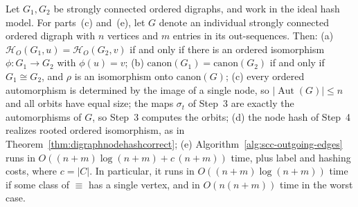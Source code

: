 \documentclass[twoside,leqno]{article}
\DeclareMathOperator{\Aut}{Aut}
\newcommand{\HO}{\mathcal{H}_{O}}
\newcommand{\canon}{\mathrm{canon}}
\newcommand{\iso}{\cong}
\begin{document}
\begin{theorem}
\label{thm:scc-ordered}
Let $G_1,G_2$ be strongly connected ordered digraphs, and work in the ideal hash model. For parts~(c) and~(e), let $G$ denote an individual strongly connected ordered digraph with $n$ vertices and $m$ entries in its out-sequences. Then:
(a) $\HO(G_1,u)=\HO(G_2,v)$ if and only if there is an ordered isomorphism $\phi:G_1\to G_2$ with $\phi(u)=v$;
(b) $\canon(G_1)=\canon(G_2)$ if and only if $G_1\iso G_2$, and $\rho$ is an isomorphism onto $\canon(G)$;
(c) every ordered automorphism is determined by the image of a single node, so $|\Aut(G)|\le n$ and all orbits have equal size; the maps $\sigma_t$ of Step~3 are exactly the automorphisms of $G$, so Step~3 computes the orbits;
(d) the node hash of Step~4 realizes rooted ordered isomorphism, as in Theorem~\ref{thm:digraphnodehashcorrect};
(e) Algorithm~\ref{alg:scc-outgoing-edges} runs in $O((n+m)\log(n+m)+c\,(n+m))$ time, plus label and hashing costs, where $c=|C|$. In particular, it runs in $O((n+m)\log(n+m))$ time if some class of $\equiv$ has a single vertex, and in $O(n(n+m))$ time in the worst case.
\end{theorem}
\end{document}
